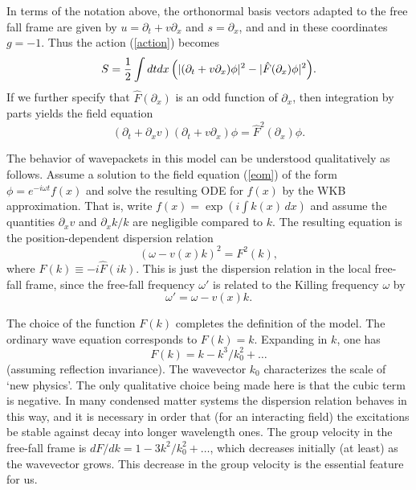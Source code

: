 \documentclass[12pt]{article}
\begin{document}
In terms of the notation above, the orthonormal basis vectors adapted to the
free fall frame
are given by $u=\partial_t+v\partial_x$ and $s=\partial_x$, and
and in these coordinates $g=-1$. Thus the action (\ref{action}) becomes
\begin{equation}
S={1\over2}\int dtdx\,
\Bigl(|(\partial_t+v\partial_x)\phi|^2 -|\hat{F}(\partial_x)\phi|^2\Bigr).
\end{equation}
If we further specify that $\hat{F}(\partial_x)$ is an odd function of
$\partial_x$,
then integration by parts yields the field equation
\begin{equation}
(\partial_t+\partial_x
v)(\partial_t+v\partial_x)\phi=\hat{F}^2(\partial_x)\phi.
\label{eom}
\end{equation}

The behavior of wavepackets in this model can be understood
qualitatively as follows.  Assume a solution to the field equation
(\ref{eom}) of the form $\phi = e^{-i \omega t} f(x)$ and solve the
resulting ODE for $f(x)$ by the WKB approximation. That is, write $f(x)
= \exp(i\int k(x)\,dx)$ and assume the quantities $\partial_x v$ and
$\partial_x k/k$ are negligible compared to $k$.  The resulting
equation is the position-dependent dispersion relation
\begin{equation}
(\omega - v(x)k)^{2} = F^{2}(k),
\label{disp'}
\end{equation}
where $F(k)\equiv-i\hat{F}(ik)$.
This is just the dispersion relation in the local free-fall frame, since the 
free-fall frequency $\omega'$ is related to the Killing frequency $\omega$ by
\begin{equation}
\omega'=\omega-v(x)k.
\label{otrans}
\end{equation}

The choice of the function $F(k)$ completes the definition of the model. The
ordinary wave equation corresponds to $F(k)=k$.  Expanding in $k$, one has
\begin{equation}
F(k)=k-k^3/k_0^2+\dots
\end{equation}
(assuming reflection invariance). The wavevector $k_0$ characterizes
the scale of `new physics'. The only qualitative choice being made here
is that the cubic term is negative. In many condensed matter systems
the dispersion relation behaves in this way, and it is necessary in
order that (for an interacting field) the excitations be stable against
decay into longer wavelength ones\cite{Pita59}. The group velocity in
the free-fall frame is $dF/dk=1-3k^2/k_0^2+\dots$, which decreases
initially (at least) as the wavevector grows. This decrease in the
group velocity is the essential feature for us.
\end{document}
